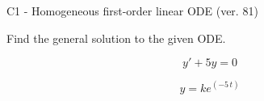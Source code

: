 \begin{exercise}
  \begin{exerciseTitle}C1 - Homogeneous first-order linear ODE (ver. 81)\end{exerciseTitle}
  \begin{exerciseStatement}
    
Find the general solution to the given ODE.

    
\[y'+5y=0\]

  \end{exerciseStatement}
  \begin{exerciseAnswer}
    
\[y= k e^{\left(-5 \, t\right)}\]

  \end{exerciseAnswer}
\end{exercise}